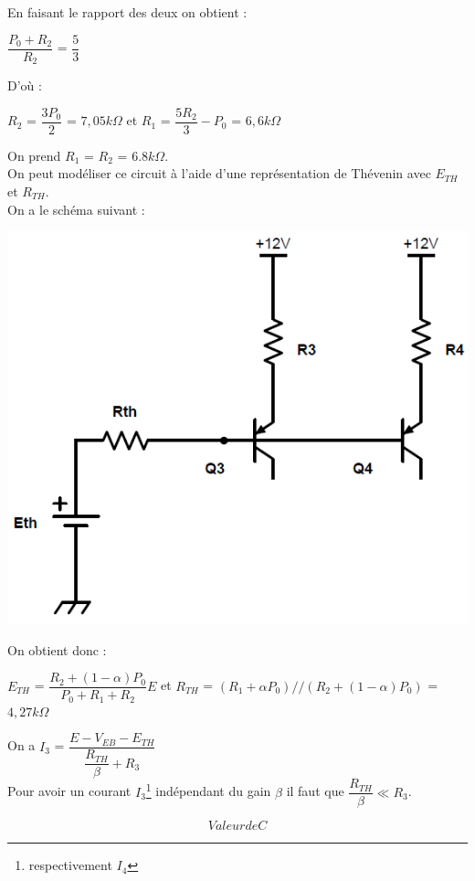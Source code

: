 \documentclass[a4paper]{report}
\begin{document}
En faisant le rapport des deux on obtient : \\
\begin{center}


 $\dfrac{P_0 + R_2}{R_2}$ = $\dfrac{5}{3}$ \\
\end{center}
D'où : \\
\begin{center}
$R_2$ = $\dfrac{3P_0}{2}$ = $7,05k \Omega$ et $R_1$ = $\dfrac{5R_2}{3}-P_0$ = $6,6k \Omega$\\
\end{center} 
On prend $R_1$ = $R_2$ = $6.8k \Omega$.\\
On peut modéliser ce circuit à l'aide d'une représentation de Thévenin avec $E_{TH}$ et $R_{TH}$.\\
On a le schéma suivant :\\
\begin{center}
\includegraphics[width=.41\textwidth]{th.PNG}
\end{center}
On obtient donc : \\
\begin{center}
$E_{TH}$ = $\dfrac{R_2 + (1-\alpha)P_0}{P_0 + R_1 + R_2}E$ et $R_{TH}$ = $(R_1 + \alpha P_0)//(R_2 + (1-\alpha)P_0)$ = $4,27k\Omega$\\
\end{center}
On a $I_3$ = $\dfrac{E-V_{EB}-E_{TH}}{\dfrac{R_{TH}}{\beta}+ R_3}$\\
Pour avoir un courant $I_3$\footnote{respectivement $I_4$} indépendant du gain $\beta$ il faut que $\dfrac{R_{TH}}{\beta} \ll R_3$.

$$Valeur de C$$
\end{document}
